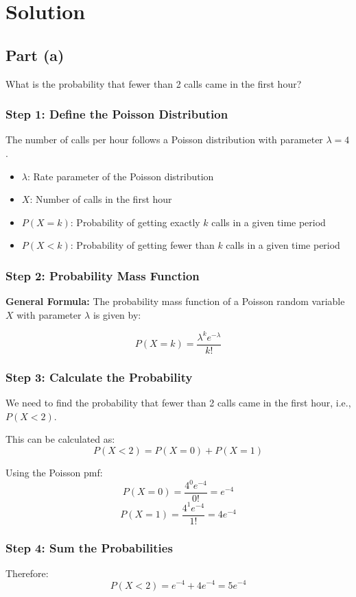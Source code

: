 \documentclass[12pt]{article}
\begin{document}
\section*{Solution}

\subsection*{Part (a)} What is the probability that fewer than 2 calls came in the first hour?

\subsubsection*{Step 1: Define the Poisson Distribution}
The number of calls per hour follows a Poisson distribution with parameter \( \lambda = 4 \).
\begin{itemize}
  \item \( \lambda \): Rate parameter of the Poisson distribution
  \item \( X \): Number of calls in the first hour
  \item \( P(X = k) \): Probability of getting exactly \( k \) calls in a given time period
  \item \( P(X < k) \): Probability of getting fewer than \( k \) calls in a given time period
\end{itemize}

\subsubsection*{Step 2: Probability Mass Function}
\textbf{General Formula:} The probability mass function of a Poisson random variable \( X \) with parameter \( \lambda \) is given by:

\[ P(X = k) = \frac{\lambda^k e^{-\lambda}}{k!} \]

\subsubsection*{Step 3: Calculate the Probability}
We need to find the probability that fewer than 2 calls came in the first hour, i.e., \( P(X < 2) \).

This can be calculated as:
\[ P(X < 2) = P(X = 0) + P(X = 1) \]

Using the Poisson pmf:
\[ P(X = 0) = \frac{4^0 e^{-4}}{0!} = e^{-4} \]
\[ P(X = 1) = \frac{4^1 e^{-4}}{1!} = 4e^{-4} \]

\subsubsection*{Step 4: Sum the Probabilities}
Therefore:
\[ P(X < 2) = e^{-4} + 4e^{-4} = 5e^{-4} \]
\end{document}
